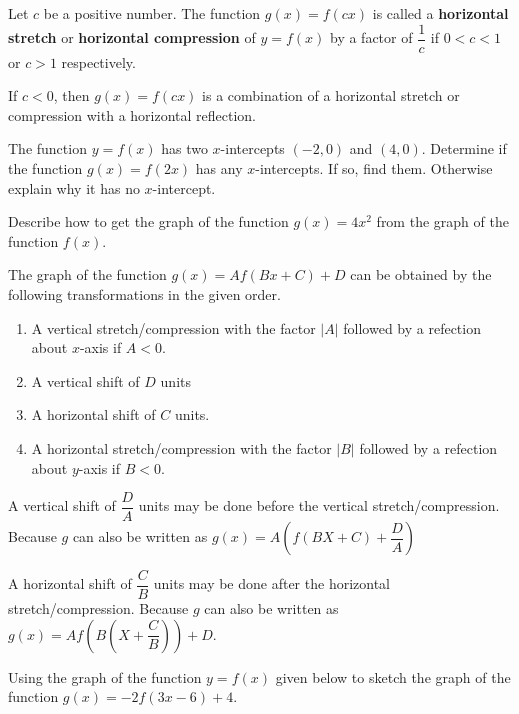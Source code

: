 \begin{definition}
  Let $c$ be a positive number.
  The function $g(x)=f(cx)$ is called a \textbf{horizontal stretch} or \textbf{horizontal compression} of $y=f(x)$ by a factor of $\dfrac{1}{c}$ if $0<c<1$ or $c>1$ respectively.
\end{definition}
\begin{remark}
  If $c<0$, then $g(x)=f(cx)$ is a combination of a horizontal stretch or compression with a horizontal reflection.
\end{remark}
\begin{example}
  The function $y=f(x)$ has two $x$-intercepts $(-2, 0)$ and $(4, 0)$. Determine if the function $g(x)=f(2x)$ has any $x$-intercepts. If so, find them. Otherwise explain why it has no $x$-intercept.
\end{example}

\begin{example}
  Describe how to get the graph of the function $g(x)=4x^2$ from the graph of the function $f(x)$.
\end{example}
\newpage

\begin{howto}
  The graph of the function $g(x)=Af(Bx+C)+D$ can be obtained by the following transformations in the given order.
  \begin{enumerate}
    \item A vertical stretch/compression with the factor $|A|$ followed by a refection about $x$-axis if $A<0$.
    \item A vertical shift of $D$ units
    \item A horizontal shift of $C$ units.
    \item A horizontal stretch/compression with the factor $|B|$ followed by a refection about $y$-axis if $B<0$.
  \end{enumerate}
\end{howto}
\begin{remark}
  A vertical shift of $\dfrac{D}{A}$ units may be done before the vertical stretch/compression. Because $g$ can also be written as $g(x)=A\left(f(BX+C)+\dfrac{D}{A}\right)$

  A horizontal shift of $\dfrac{C}{B}$ units may be done after the horizontal stretch/compression. Because $g$ can also be written as $g(x)=Af\left(B\left(X+\dfrac{C}{B}\right)\right)+D$.
\end{remark}
\begin{example}
  Using the graph of the function $y=f(x)$ given below to sketch the graph of the function $g(x)=-2f(3x-6)+4$.\\

\end{example}

